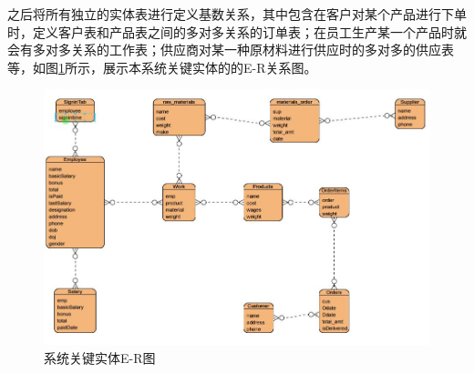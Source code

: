 之后将所有独立的实体表进行定义基数关系，其中包含在客户对某个产品进行下单时，定义客户表和产品表之间的多对多关系的订单表；在员工生产某一个产品时就会有多对多关系的工作表；供应商对某一种原材料进行供应时的多对多的供应表等，如图\ref{fig:er}所示，展示本系统关键实体的的E-R关系图。

\begin{figure}[H]
    \centering
    \includegraphics[width=.75\textwidth]{figures/4er.jpg}
    \caption{系统关键实体E-R图}
    \label{fig:er}
\end{figure}
